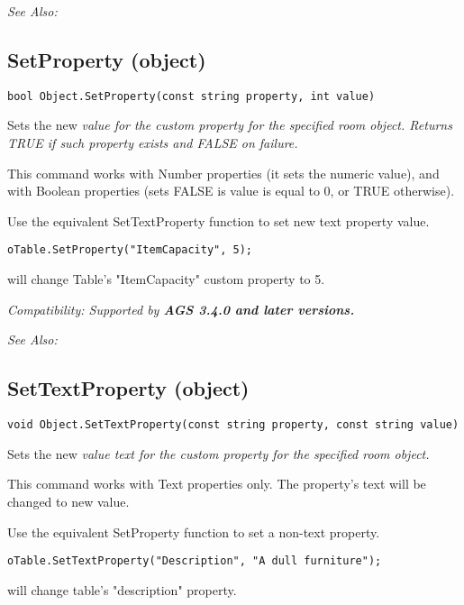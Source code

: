 \it{See Also:} 


\subsection{SetProperty (object)}\label{Object.SetProperty}%

\begin{verbatim}
bool Object.SetProperty(const string property, int value)
\end{verbatim}
Sets the new \it{value} for the custom \it{property} for the specified room object. Returns
TRUE if such property exists and FALSE on failure.

This command works with Number properties (it sets the numeric value), and with Boolean
properties (sets FALSE is value is equal to 0, or TRUE otherwise).

Use the equivalent SetTextProperty function to set new text property value.

\begin{verbatim}
oTable.SetProperty("ItemCapacity", 5);
\end{verbatim}
will change Table's "ItemCapacity" custom property to 5.

\it{Compatibility:} Supported by \bf{AGS 3.4.0} and later versions.

\it{See Also:} 


\subsection{SetTextProperty (object)}\label{Object.SetTextProperty}%

\begin{verbatim}
void Object.SetTextProperty(const string property, const string value)
\end{verbatim}
Sets the new \it{value} text for the custom \it{property} for the specified room object.

This command works with Text properties only. The property's text will be
changed to new value.

Use the equivalent SetProperty function to set a non-text property.

\begin{verbatim}
oTable.SetTextProperty("Description", "A dull furniture");
\end{verbatim}
will change table's "description" property.

